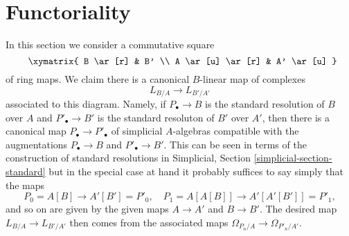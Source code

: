 \begin{example}
\end{example}








\section{Functoriality}
\label{section-functoriality}

\noindent
In this section we consider a commutative square
\begin{equation}
\label{equation-commutative-square}
\vcenter{
\xymatrix{
B \ar[r] & B' \\
A \ar[u] \ar[r] & A' \ar[u]
}
}
\end{equation}
of ring maps. We claim there is a canonical $B$-linear map of complexes
$$
L_{B/A} \longrightarrow L_{B'/A'}
$$
associated to this diagram. Namely, if $P_\bullet \to B$ is the
standard resolution of $B$ over $A$ and $P'_\bullet \to B'$ is the
standard resoluton of $B'$ over $A'$, then there is a canonical map
$P_\bullet \to P'_\bullet$
of simplicial $A$-algebras compatible with the augmentations
$P_\bullet \to B$ and $P'_\bullet \to B'$. This can be seen in terms
of the construction of standard resolutions in
Simplicial, Section \ref{simplicial-section-standard}
but in the special case at hand it probably suffices to say simply
that the maps
$$
P_0 = A[B] \longrightarrow A'[B'] = P'_0,\quad
P_1 = A[A[B]] \longrightarrow A'[A'[B']] = P'_1,
$$
and so on are given by the given maps $A \to A'$ and $B \to B'$.
The desired map $L_{B/A} \to L_{B'/A'}$ then comes from the associated
maps $\Omega_{P_n/A} \to \Omega_{P'_n/A'}$.

